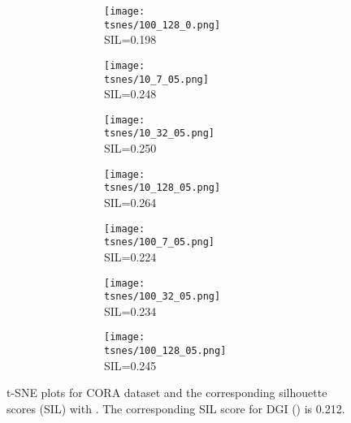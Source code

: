 \documentclass{article}
\begin{document}
\begin{figure}[ht]
\begin{center}
\begin{subfigure}[b]{\linewidth}
\begin{subfigure}[b]{.49\linewidth}
\begin{subfigure}[b]{.25\linewidth}
        \texttt{[image: tsnes/100\_128\_0.png]}
        SIL=0.198
        \end{subfigure}
        \caption{}
        \label{figa0b100}
        \end{subfigure}
\end{subfigure}
\par\bigskip
\begin{subfigure}[b]{\linewidth}
    \begin{subfigure}[b]{.49\linewidth}
    \centering
        \begin{subfigure}[b]{.25\linewidth}
        \centering
        \texttt{[image: tsnes/10\_7\_05.png]}
        SIL=0.248
        \end{subfigure}
        \begin{subfigure}[b]{.25\linewidth}
        \centering
        \texttt{[image: tsnes/10\_32\_05.png]}
        SIL=0.250
        \end{subfigure}
        \begin{subfigure}[b]{.25\linewidth}
        \centering
        \texttt{[image: tsnes/10\_128\_05.png]}
        SIL=0.264
        \end{subfigure}
    \caption{}
    \label{figa05b10}
    \end{subfigure}
    \hfill
    \begin{subfigure}[b]{.49\linewidth}
        \begin{subfigure}[b]{.25\linewidth}
        \centering
        \texttt{[image: tsnes/100\_7\_05.png]}
        SIL=0.224
        \end{subfigure}
        \begin{subfigure}[b]{.25\linewidth}
        \centering
        \texttt{[image: tsnes/100\_32\_05.png]}
        SIL=0.234
        \end{subfigure}
        \begin{subfigure}[b]{.25\linewidth}
        \centering
        \texttt{[image: tsnes/100\_128\_05.png]}
        SIL=0.245
        \end{subfigure}
\caption{}
        \label{figa05b100}
        \end{subfigure}
\end{subfigure}
\end{center}
\caption{t-SNE plots for CORA dataset and the corresponding silhouette scores (SIL) with . The corresponding SIL score for DGI () is 0.212.}
\label{figablation}
\end{figure}   
\end{document}
